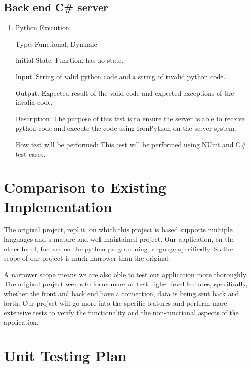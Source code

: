 \documentclass[12pt, titlepage]{article}
\begin{document}
  \subsection{Back end C\# server}

    \begin{enumerate}

    \item{Python Execution\\}

    Type: Functional, Dynamic

    Initial State: Function, has no state.

    Input: String of valid python code and a string of invalid python code.

    Output: Expected result of the valid code and expected exceptions of the
        invalid code.
              
    Description: The purpose of this test is to ensure the server is able to
    receive python code and execute the code using IronPython on the server system.
              
    How test will be performed: This test will be performed using NUint and C\#
    test cases.
              
    \end{enumerate}
	
\section{Comparison to Existing Implementation}	
The original project, repl.it, on which this project is based supports multiple
languages and a mature and well maintained project. Our application, on the
other hand, focuses on the python programming language specifically. So the
scope of our project is much narrower than the original.

A narrower scope means we are also able to test our application more thoroughly.
The original project seems to focus more on test higher level features,
specifically, whether the front and back end have a connection, data is being
sent back and forth. Our project will go more into the specific features and
perform more extensive tests to verify the functionality and the non-functional
aspects of the application.

				
\section{Unit Testing Plan}
		
\end{document}
